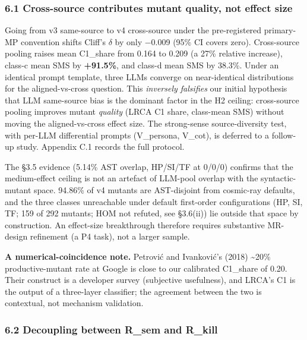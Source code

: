 \documentclass[review,12pt,authoryear]{elsarticle}
\begin{document}
\subsubsection{6.1 Cross-source contributes mutant quality, not effect
size}\label{cross-source-contributes-mutant-quality-not-effect-size}

Going from v3 same-source to v4 cross-source under the pre-registered
primary-MP convention shifts Cliff's $\delta$ by only −0.009 (95\% CI covers
zero). Cross-source pooling raises mean C1\_share from 0.164 to 0.209 (a
27\% relative increase), class-c mean SMS by \textbf{+91.5\%}, and
class-d mean SMS by 38.3\%. Under an identical prompt template, three
LLMs converge on near-identical distributions for the aligned-vs-cross
question. This \emph{inversely falsifies} our initial hypothesis that
LLM same-source bias is the dominant factor in the H2 ceiling:
cross-source pooling improves mutant \emph{quality} (LRCA C1 share,
class-mean SMS) without moving the aligned-vs-cross effect size. The
strong-sense source-diversity test, with per-LLM differential prompts
(V\_persona, V\_cot), is deferred to a follow-up study. Appendix C.1
records the full protocol.

The §3.5 evidence (5.14\% AST overlap, HP/SI/TF at 0/0/0) confirms that
the medium-effect ceiling is not an artefact of LLM-pool overlap with
the syntactic-mutant space. 94.86\% of v4 mutants are AST-disjoint from
cosmic-ray defaults, and the three classes unreachable under default
first-order configurations (HP, SI, TF; 159 of 292 mutants; HOM not
refuted, see §3.6(ii)) lie outside that space by construction. An
effect-size breakthrough therefore requires substantive MR-design
refinement (a P4 task), not a larger sample.

\textbf{A numerical-coincidence note.} Petrović and Ivanković's (2018)
\textasciitilde20\% productive-mutant rate at Google is close to our
calibrated C1\_share of 0.20. Their construct is a developer survey
(subjective usefulness), and LRCA's C1 is the output of a three-layer
classifier; the agreement between the two is contextual, not mechanism
validation.

\subsubsection{6.2 Decoupling between R\_sem and
R\_kill}\label{decoupling-between-r_sem-and-r_kill}
\end{document}
